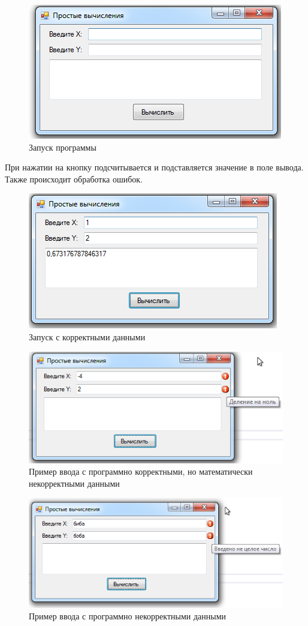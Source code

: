 \begin{figure}
\centering
\includegraphics[width=0.5\linewidth]{images//simple-calculations/start.png}
\caption{Запуск программы}
\label{fig:simple-calculations-start}
\end{figure}

При нажатии на кнопку подсчитывается и подставляется значение в поле вывода. Также происходит обработка ошибок.

\begin{figure}
\centering
\includegraphics[width=0.5\linewidth]{images//simple-calculations/okay.png}
\caption{Запуск с корректными данными}
\label{fig:simple-calculations-okay}
\end{figure}

\begin{figure}
\centering
\includegraphics[width=0.5\linewidth]{images//simple-calculations/error.png}
\caption{Пример ввода с программно корректными, но математически некорректными данными}
\label{fig:simple-calculations-error}
\end{figure}

\begin{figure}
\centering
\includegraphics[width=0.5\linewidth]{images//simple-calculations/error2.png}
\caption{Пример ввода с программно некорректными данными}
\label{fig:simple-calculations-error2}
\end{figure}

